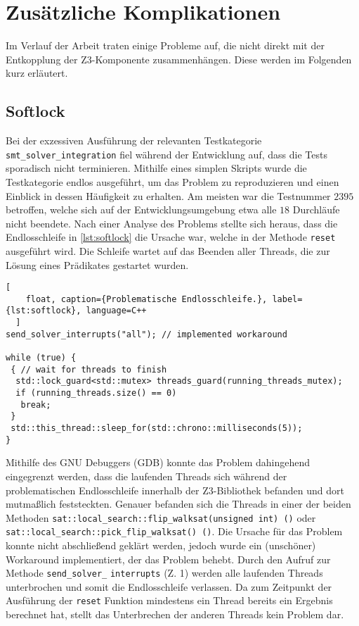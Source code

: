 
\section{Zusätzliche Komplikationen}

Im Verlauf der Arbeit traten einige Probleme auf, die nicht direkt mit der Entkopplung der Z3-Komponente zusammenhängen. Diese werden im Folgenden kurz erläutert.

\subsection{Softlock}
\label{subsec:softlock}

Bei der exzessiven Ausführung der relevanten Testkategorie \texttt{smt\_solver\_integration} fiel während der Entwicklung auf,
dass die Tests sporadisch nicht terminieren.
Mithilfe eines simplen Skripts wurde die Testkategorie endlos ausgeführt, um das Problem zu reproduzieren und einen Einblick in dessen Häufigkeit zu erhalten.
Am meisten war die Testnummer $2395$ betroffen, welche sich auf der Entwicklungsumgebung etwa alle $18$ Durchläufe nicht beendete.
Nach einer Analyse des Problems stellte sich heraus, dass die Endlosschleife in \cref{lst:softlock} die Ursache war, welche in der Methode \texttt{reset} ausgeführt wird.
Die Schleife wartet auf das Beenden aller Threads, die zur Lösung eines Prädikates gestartet wurden.

\begin{lstlisting}[
    float, caption={Problematische Endlosschleife.}, label={lst:softlock}, language=C++
  ]
send_solver_interrupts("all"); // implemented workaround

while (true) {
 { // wait for threads to finish
  std::lock_guard<std::mutex> threads_guard(running_threads_mutex);
  if (running_threads.size() == 0)
   break;
 }
 std::this_thread::sleep_for(std::chrono::milliseconds(5));
}
\end{lstlisting}

Mithilfe des GNU Debuggers (GDB) \cite{stallman1988debugging} konnte das Problem dahingehend eingegrenzt werden,
dass die laufenden Threads sich während der problematischen Endlosschleife innerhalb der Z3-Bibliothek befanden
und dort mutmaßlich feststeckten.
Genauer befanden sich die Threads in einer der beiden Methoden \texttt{sat::local\_search::flip\_walksat(unsigned int) ()} oder \texttt{sat::local\_search::pick\_flip\_walksat() ()}.
Die Ursache für das Problem konnte nicht abschließend geklärt werden, jedoch wurde ein (unschöner) Workaround implementiert, der das Problem behebt.
Durch den Aufruf zur Methode \texttt{send\_solver\_} \texttt{interrupts} (Z. 1) werden alle laufenden Threads unterbrochen und somit die Endlosschleife verlassen.
Da zum Zeitpunkt der Ausführung der \texttt{reset} Funktion mindestens ein Thread bereits ein Ergebnis berechnet hat, stellt das Unterbrechen der anderen Threads kein Problem dar.

